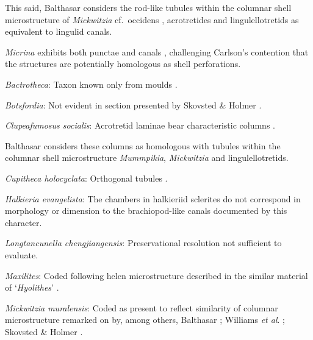 \documentclass[openany]{book}
\begin{document}
This said, Balthasar \citeyearpar{Balthasar2008iMummpikia} considers the
rod-like tubules within the columnar shell microstructure of
\emph{Mickwitzia} cf.~occidens \citep[1--3 µm
wide,][]{Skovsted2003EarlyCambrian}, acrotretides \citep[1 µm wide,
see][\citet{Zhang2016Epithelialcell}]{Holmer1989MiddleOrdovician} and
lingulellotretids \citep[100 nm wide,][]{Cusack1999Chemicostructural} as
equivalent to lingulid canals.

\emph{Micrina} exhibits both punctae and canals
\citep{Harper2017Brachiopodsorigin}, challenging Carlson's contention
\citep[in][]{Williams2007Supplement} that the structures are potentially
homologous as shell perforations.

\hypertarget{Bactrotheca-coding-137}{}
\emph{Bactrotheca}: Taxon known only from moulds \citep{Valent2012}.

\hypertarget{Botsfordia-coding-137}{}
\emph{Botsfordia}: Not evident in section presented by Skovsted \&
Holmer \citeyearpar{Skovsted2003EarlyCambrian}.

\hypertarget{Clupeafumosus_socialis-coding-137}{}
\emph{Clupeafumosus socialis}: Acrotretid laminae bear characteristic
columns \citep[e.g.][]{Zhang2016Epithelialcell}.

Balthasar \citeyearpar{Balthasar2008iMummpikia} considers these columns
as homologous with tubules within the columnar shell microstructure
\emph{Mummpikia}, \emph{Mickwitzia} and lingulellotretids.

\hypertarget{Cupitheca_holocyclata-coding-137}{}
\emph{Cupitheca holocyclata}: Orthogonal tubules \citep{Vendrasco2017}.

\hypertarget{Halkieria_evangelista-coding-137}{}
\emph{Halkieria evangelista}: The chambers in halkieriid sclerites do
not correspond in morphology or dimension to the brachiopod-like canals
documented by this character.

\hypertarget{Longtancunella_chengjiangensis-coding-137}{}
\emph{Longtancunella chengjiangensis}: Preservational resolution not
sufficient to evaluate.

\hypertarget{Maxilites-coding-137}{}
\emph{Maxilites}: Coded following helen microstructure described in the
similar material of `\emph{Hyolithes}' \citep{MartiMus2007}.

\hypertarget{Mickwitzia_muralensis-coding-137}{}
\emph{Mickwitzia muralensis}: Coded as present to reflect similarity of
columnar microstructure remarked on by, among others, Balthasar
\citeyearpar{Balthasar2008iMummpikia}; Williams \emph{et al}.
\citeyearpar{Williams2007Supplement}; Skovsted \& Holmer
\citeyearpar{Skovsted2003EarlyCambrian}.
\end{document}

